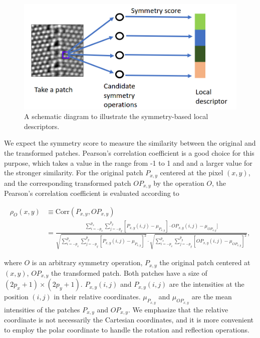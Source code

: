 \documentclass[twocolumn,amsmath, floatfix]{revtex4}
\begin{document}
\begin{figure}[htbp]
\centering
\includegraphics[width=1.\columnwidth]{schematic_diagram_local_descriptors.png}
\caption{A schematic diagram to illustrate the symmetry-based local descriptors.} 
\label{local_descriptors}
\end{figure}
We expect the symmetry score to measure the similarity between the original and the transformed patches. Pearson's correlation coefficient is a good choice for this purpose, which takes a value in the range from -1 to 1 and and a larger value for the stronger similarity. For the original patch $P_{x,y}$ centered at the pixel $(x,y)$, and the corresponding transformed patch $OP_{x,y}$ by the operation $O$, the Pearson's correlation coefficient is evaluated according to 
\begin{widetext}
\begin{equation}\label{symmetry_score}
\begin{aligned}
\rho_O(x,y)  &\equiv \mathrm{Corr}\left( P_{x,y}, OP_{x,y} \right) \\
& =  \frac{\sum_{i=-p_x}^{p_x}\sum_{j=-p_y}^{p_y}[P_{x,y}(i,j)-\mu_{P_{x,y}}]\cdot OP_{x,y}(i,j)-\mu_{OP_{x,y}}{}]}{\sqrt{\sum_{i=-p_x}^{p_x}\sum_{j=-p_y}^{p_y}[P_{x,y}(i,j)-\mu_{P_{x,y}}]^2} \cdot \sqrt{\sum_{i=-p_x}^{p_x}\sum_{j=-p_y}^{p_y}[OP_{x,y}(i,j)-\mu_{OP_{x,y}}]^2} },
\end{aligned}
\end{equation}
\end{widetext}
where $O$ is an arbitrary symmetry operation, $P_{x,y}$ the original patch centered at $(x,y)$, $OP_{x,y}$ the transformed patch. Both patches have a size of $(2p_x+1) \times (2p_y+1)$.  $P_{x,y}(i,j)$ and $P_{x,y}(i,j)$ are the intensities at the position $(i,j)$ in their relative coordinates. $\mu_{P_{x,y}}$ and $\mu_{OP_{x,y}}$  are the mean intensities of the patches $P_{x,y}$ and $OP_{x,y}$.  We emphasize that the relative coordinate is not necessarily the Cartesian coordinates, and it is more convenient to employ the polar coordinate to handle the rotation and reflection operations.
\end{document}
